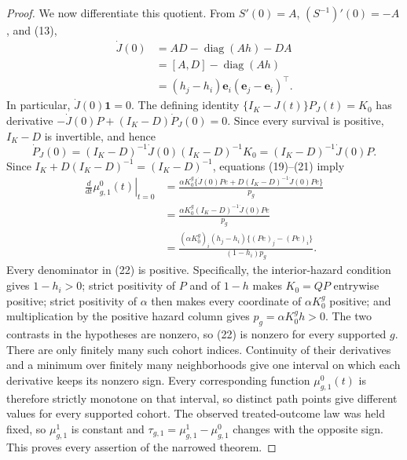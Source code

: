 \documentclass{article}
\begin{document}
\begin{proof}
We now differentiate this quotient. From \(S'(0)=A\), \((S^{-1})'(0)=-A\), and (13),
\[
\begin{aligned}
 \dot J(0)
 &=AD-\operatorname{diag}(Ah)-DA\\
 &=[A,D]-\operatorname{diag}(Ah)\\
 &=(h_j-h_i)\mathbf e_i(\mathbf e_j-\mathbf e_i)^{\top}.
                                                                    \tag{20}
\end{aligned}
\]
In particular, \(\dot J(0)\mathbf 1=0\). The defining identity \(\{I_K-J(t)\}P_J(t)=K_0\) has derivative \(-\dot J(0)P+(I_K-D)\dot P_J(0)=0\). Since every survival is positive, \(I_K-D\) is invertible, and hence
\[
 \dot P_J(0)=(I_K-D)^{-1}\dot J(0)(I_K-D)^{-1}K_0
 =(I_K-D)^{-1}\dot J(0)P.                                    \tag{21}
\]
Since \(I_K+D(I_K-D)^{-1}=(I_K-D)^{-1}\), equations (19)--(21) imply
\[
\begin{aligned}
 \left.\frac{d}{dt}\mu^0_{g,1}(t)\right|_{t=0}
 &=\frac{\alpha K_0^g\{\dot J(0)Pe+D(I_K-D)^{-1}\dot J(0)Pe\}}{p_g}\\
 &=\frac{\alpha K_0^g(I_K-D)^{-1}\dot J(0)Pe}{p_g}\\
 &=\frac{(\alpha K_0^g)_i(h_j-h_i)\{(Pe)_j-(Pe)_i\}}
 {(1-h_i)p_g}.                                                  \tag{22}
\end{aligned}
\]
Every denominator in (22) is positive. Specifically, the interior-hazard condition gives \(1-h_i>0\); strict positivity of \(P\) and of \(1-h\) makes \(K_0=QP\) entrywise positive; strict positivity of \(\alpha\) then makes every coordinate of \(\alpha K_0^g\) positive; and multiplication by the positive hazard column gives \(p_g=\alpha K_0^gh>0\). The two contrasts in the hypotheses are nonzero, so (22) is nonzero for every supported \(g\). There are only finitely many such cohort indices. Continuity of their derivatives and a minimum over finitely many neighborhoods give one interval on which each derivative keeps its nonzero sign. Every corresponding function \(\mu^0_{g,1}(t)\) is therefore strictly monotone on that interval, so distinct path points give different values for every supported cohort. The observed treated-outcome law was held fixed, so \(\mu^1_{g,1}\) is constant and \(\tau_{g,1}=\mu^1_{g,1}-\mu^0_{g,1}\) changes with the opposite sign. This proves every assertion of the narrowed theorem.
\end{proof}
\end{document}
